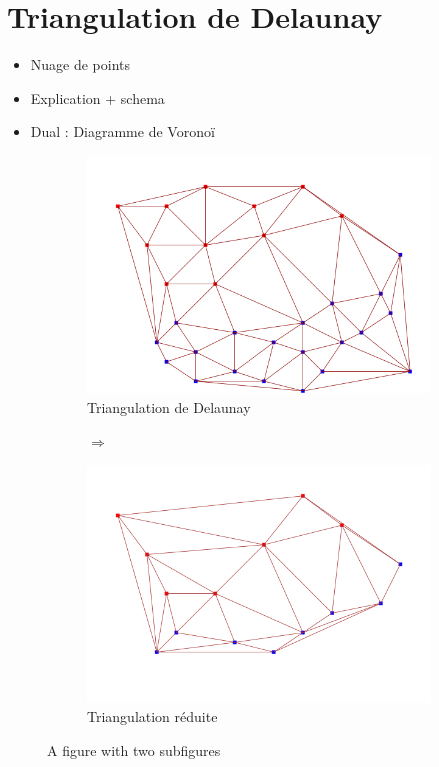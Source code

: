 \section{Triangulation de Delaunay}
\begin{itemize}
  \item Nuage de points
  \item Explication + schema
  \item Dual : Diagramme de Voronoï
\end{itemize}

\begin{figure}[ht]
\centering
\begin{subfigure}{0.4\textwidth}
  \centering
  \includegraphics[width=\textwidth]{figures/delaunay.png}
  \caption{Triangulation de Delaunay}
  \label{fig::delaunay_tr}
\end{subfigure}%
\begin{subfigure}{0.2\textwidth}
  \centering
  $\Longrightarrow$
\end{subfigure}%
\begin{subfigure}{0.4\textwidth}
  \centering
  \includegraphics[width=\textwidth]{figures/delaunay_reduced.png}
  \caption{Triangulation réduite}
  \label{fig:delaunay_reduced}
\end{subfigure}
\caption{A figure with two subfigures}
\label{fig:delaunays}
\end{figure}

